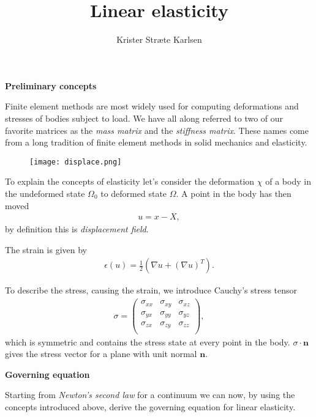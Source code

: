 \documentclass[epsfig,11pt]{article}
\title{Linear elasticity}
\author{Krister Stræte Karlsen}
\begin{document}
\maketitle

\textbf{Preliminary concepts}

Finite element methods are most widely used for computing deformations and stresses of bodies subject to load. We have all along referred to two of our favorite matrices as the \emph{mass matrix} and the \emph{stiffness matrix}. These names come from a long tradition of finite element methods in solid  mechanics and elasticity. 

\begin{figure}[h!] 
\begin{center}
  \texttt{[image: displace.png]}
  \end{center}
\end{figure}

To explain the concepts of elasticity let's consider the deformation $\chi$ of a body in the undeformed state $\Omega_0$ to deformed state $\Omega$. A point in the body has then moved
\begin{align}
u = x - X,
\end{align}
by definition this is \emph{displacement field}. 

The strain is given by
\begin{align}
\epsilon(u) = \frac{1}{2} \left( \nabla u + (\nabla u)^T \right).
\end{align}

To describe the stress, causing the strain, we introduce {Cauchy's stress tensor}
\begin{align}
\sigma = \begin{pmatrix}
\sigma_{xx} & \sigma_{xy} & \sigma_{xz} \\
\sigma_{yx} & \sigma_{yy} & \sigma_{yz} \\
\sigma_{zx} & \sigma_{zy} & \sigma_{zz} \\
\end{pmatrix},
\end{align}
which is symmetric and contains the stress state at every point in the body. $\sigma \cdot \mathbf{n}$ gives the stress vector for a plane with unit normal $\mathbf{n}$.

\textbf{Governing equation}

Starting from \emph{Newton's second law} for a continuum we can now, by using the concepts introduced above, derive the governing equation for linear elasticity.
\end{document}
